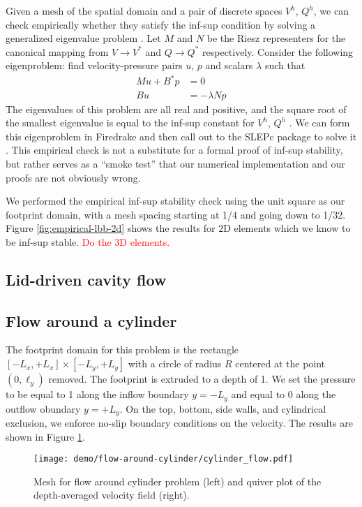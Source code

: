 \documentclass{article}
\theoremstyle{definition}
\theoremstyle{plain}
\begin{document}
Given a mesh of the spatial domain and a pair of discrete spaces $V^h$, $Q^h$, we can check empirically whether they satisfy the inf-sup condition by solving a generalized eigenvalue problem \citep{rognes2012automated}.
Let $M$ and $N$ be the Riesz representers for the canonical mapping from $V \to V^*$ and $Q \to Q^*$ respectively.
Consider the following eigenproblem: find velocity-pressure pairs $u$, $p$ and scalars $\lambda$ such that
\begin{align}
    Mu + B^*p & = 0 \\
    Bu & = -\lambda Np
\end{align}
The eigenvalues of this problem are all real and positive, and the square root of the smallest eigenvalue is equal to the inf-sup constant for $V^h$, $Q^h$ \citep{malkus1981eigenproblems}.
We can form this eigenproblem in Firedrake and then call out to the SLEPc package to solve it \citep{hernandez2005slepc}.
This empirical check is not a substitute for a formal proof of inf-sup stability, but rather serves as a ``smoke test'' that our numerical implementation and our proofs are not obviously wrong.

We performed the empirical inf-sup stability check using the unit square as our footprint domain, with a mesh spacing starting at 1/4 and going down to 1/32.
Figure \ref{fig:empirical-lbb-2d} shows the results for 2D elements which we know to be inf-sup stable.
\textcolor{red}{Do the 3D elements.}


\subsection{Lid-driven cavity flow}

\subsection{Flow around a cylinder}

The footprint domain for this problem is the rectangle $[-L_x, +L_x] \times [-L_y, +L_y]$ with a circle of radius $R$ centered at the point $(0, \ell_y)$ removed.
The footprint is extruded to a depth of 1.
We set the pressure to be equal to 1 along the inflow boundary $y = -L_y$ and equal to 0 along the outflow obundary $y = +L_y$.
On the top, bottom, side walls, and cylindrical exclusion, we enforce no-slip boundary conditions on the velocity.
The results are shown in Figure \ref{fig:cylinder-flow}.

\begin{figure}
    \begin{center}
        \texttt{[image: demo/flow-around-cylinder/cylinder\_flow.pdf]}
    \end{center}
    \caption{Mesh for flow around cylinder problem (left) and quiver plot of the depth-averaged velocity field (right).}
    \label{fig:cylinder-flow}
\end{figure}
\end{document}
